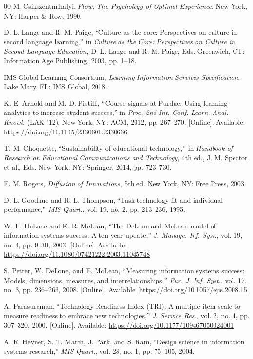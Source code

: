 \documentclass[11pt,a4paper]{article}
\begin{document}
\begin{thebibliography}{00}
M. Csikszentmihalyi, \textit{Flow: The Psychology of Optimal Experience}. New York, NY: Harper \& Row, 1990.

D. L. Lange and R. M. Paige, ``Culture as the core: Perspectives on culture in second language learning,'' in \textit{Culture as the Core: Perspectives on Culture in Second Language Education}, D. L. Lange and R. M. Paige, Eds. Greenwich, CT: Information Age Publishing, 2003, pp. 1--18.

IMS Global Learning Consortium, \textit{Learning Information Services Specification}. Lake Mary, FL: IMS Global, 2018.

K. E. Arnold and M. D. Pistilli, ``Course signals at Purdue: Using learning analytics to increase student success,'' in \textit{Proc. 2nd Int. Conf. Learn. Anal. Knowl.} (LAK '12), New York, NY: ACM, 2012, pp. 267--270. [Online]. Available: \url{https://doi.org/10.1145/2330601.2330666}

T. M. Choquette, ``Sustainability of educational technology,'' in \textit{Handbook of Research on Educational Communications and Technology}, 4th ed., J. M. Spector et al., Eds. New York, NY: Springer, 2014, pp. 723--730.

E. M. Rogers, \textit{Diffusion of Innovations}, 5th ed. New York, NY: Free Press, 2003.

D. L. Goodhue and R. L. Thompson, ``Task-technology fit and individual performance,'' \textit{MIS Quart.}, vol. 19, no. 2, pp. 213--236, 1995.

W. H. DeLone and E. R. McLean, ``The DeLone and McLean model of information systems success: A ten-year update,'' \textit{J. Manage. Inf. Syst.}, vol. 19, no. 4, pp. 9--30, 2003. [Online]. Available: \url{https://doi.org/10.1080/07421222.2003.11045748}

S. Petter, W. DeLone, and E. McLean, ``Measuring information systems success: Models, dimensions, measures, and interrelationships,'' \textit{Eur. J. Inf. Syst.}, vol. 17, no. 3, pp. 236--263, 2008. [Online]. Available: \url{https://doi.org/10.1057/ejis.2008.15}

A. Parasuraman, ``Technology Readiness Index (TRI): A multiple-item scale to measure readiness to embrace new technologies,'' \textit{J. Service Res.}, vol. 2, no. 4, pp. 307--320, 2000. [Online]. Available: \url{https://doi.org/10.1177/109467050024001}

A. R. Hevner, S. T. March, J. Park, and S. Ram, ``Design science in information systems research,'' \textit{MIS Quart.}, vol. 28, no. 1, pp. 75--105, 2004.


\end{thebibliography}
\end{document}
